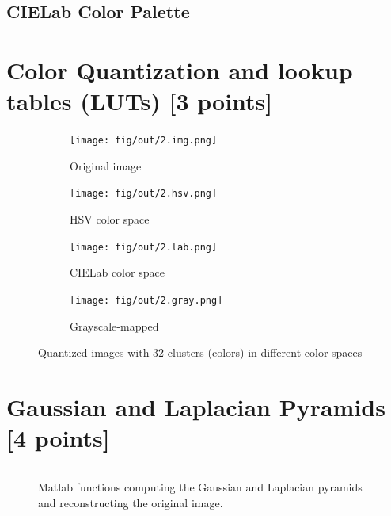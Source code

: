 \documentclass[tikz,14pt,fleqn]{article}
\begin{document}
\subsection{CIELab Color Palette}


\section{Color Quantization and lookup tables (LUTs) [3 points]}
\begin{figure}
    \begin{subfigure}[]{0.245\linewidth}
        \texttt{[image: fig/out/2.img.png]}
        \caption{Original image}
        \label{fig:2.img}
    \end{subfigure}
    \begin{subfigure}[]{0.245\linewidth}
        \texttt{[image: fig/out/2.hsv.png]}
        \caption{HSV color space}
        \label{fig:2.hsv}
    \end{subfigure}
    \begin{subfigure}[]{0.245\linewidth}
        \texttt{[image: fig/out/2.lab.png]}
        \caption{CIELab color space}
        \label{fig:2.lab}
    \end{subfigure}
    \begin{subfigure}[]{0.245\linewidth}
        \texttt{[image: fig/out/2.gray.png]}
        \caption{Grayscale-mapped}
        \label{fig:2.gray}
    \end{subfigure}
    \caption{Quantized images with 32 clusters (colors) in different color spaces}
    \label{fig:2}
\end{figure}



\section{Gaussian and Laplacian Pyramids [4 points]}

\begin{figure}[h!]
    \vspace*{-0.2cm}
    \inputminted[firstline=57, frame=lines, framesep=2mm, fontsize=\small ]{matlab}{../src/ex3.m}
    \vspace*{-0.5cm}
    \caption{Matlab functions computing the Gaussian and Laplacian pyramids and reconstructing the original image.}
\end{figure}
\end{document}

